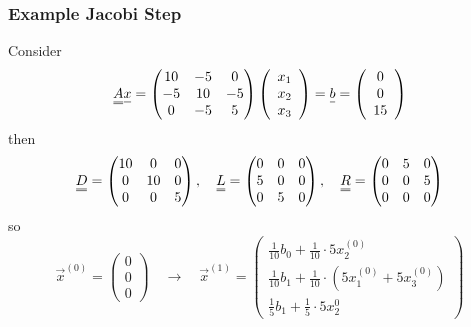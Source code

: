 \subsubsection{Example Jacobi Step}
Consider
\begin{equation}
    \mat{A} \vec{x} = \begin{pmatrix} 10 & -5 & 0 \\ -5 & 10 & -5 \\ 0 & -5 & 5 \end{pmatrix} \left( \begin{array}{c} x_1 \\ x_2 \\ x_3 \end{array} \right) = \vec{b} = \left( \begin{array}{c} 0 \\ 0 \\ 15 \end{array} \right)
\end{equation}
then
\begin{equation}
    \mat{D} = \begin{pmatrix} 10 & 0 & 0 \\ 0 & 10 & 0 \\ 0 & 0 & 5 \end{pmatrix}, \quad \mat{L} = \begin{pmatrix} 0 & 0 & 0 \\ 5 & 0 & 0 \\ 0 & 5 & 0 \end{pmatrix}, \quad \mat{R} = \begin{pmatrix} 0 & 5 & 0 \\ 0 & 0 & 5 \\ 0 & 0 & 0 \end{pmatrix}
\end{equation}
so
\begin{equation}
    \vec{x}^{(0)} = \left( \begin{array}{c} 0 \\ 0 \\ 0 \end{array} \right) \quad \rightarrow \quad \vec{x}^{(1)} = \left( \begin{array}{c} \frac{1}{10} b_0 + \frac{1}{10}\cdot 5 x^{(0)}_2 \\ \frac{1}{10} b_1 + \frac{1}{10}\cdot \left( 5 x^{(0)}_1 + 5 x^{(0)}_3 \right) \\ \frac{1}{5} b_1 + \frac{1}{5} \cdot 5 x^{0}_2 \end{array} \right)
\end{equation}

